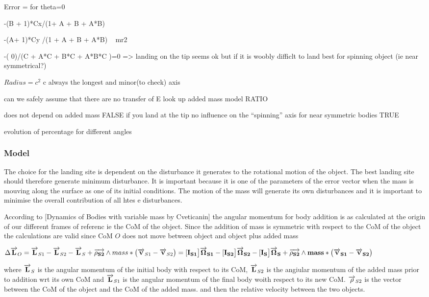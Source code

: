 Error = for theta=0

-(B + 1)*Cx/(1+ A + B + A*B) 

-(A+ 1)*Cy /(1  + A + B + A*B) ~ mr2

-(  0)/(C + A*C + B*C + A*B*C )=0 => landing on the tip seems ok but if it is woobly difficlt to land best for spinning object (ie near symmetrical?)


$Radius=c^2$ c always the longest and minor(to check) axis

can we safely assume that there are no transfer of E look up added mass model RATIO

does not depend on added mass FALSE
if you land at the tip no influence on the “spinning” axis for near symmetric bodies TRUE


evolution of percentage for different angles

\subsubsection{Model}
\label{Model}
The choice for the landing site is dependent on the disturbance it generates to the rotational motion of the object. The best landing site should therefore generate minimum disturbance. It is important because it is one of the parameters of the error vector when the mass is mouving along the surface as one of its initial conditions. The motion of the mass will generate its own disturbances and it is important to  minimise the overall contribution of all htes e disturbances.

According to [Dynamics of Bodies with variable mass by Cveticanin] the angular momentum for body addition is as calculated at the origin of our different frames of referenc ie the CoM of the object. Since the addition of mass is symmetric with respect to the CoM of the object the calculations are valid since CoM $O$ does not move between object and object plus added mass

$\Delta \overrightarrow{\bf L}_{O}= \overrightarrow{\bf L}_{S1}-\overrightarrow{\bf L}_{S2}-\overrightarrow{\bf L}_{S}+\overrightarrow{\bf \rho_{S2}}\wedge mass*\big(\overrightarrow{\bf v}_{S1}-\overrightarrow{\bf v}_{S2} \big)=[\bf I_{S1}\big]\overrightarrow{\bf \Omega}_{S1}-[\bf I_{S2}\big]\overrightarrow{\bf \Omega}_{S2}-[\bf I_{S}\big]\overrightarrow{\bf \Omega}_{S}+\overrightarrow{\bf \rho_{S2}}\wedge mass*\big(\overrightarrow{\bf v}_{S1}-\overrightarrow{\bf v}_{S2} \big)$

where $\overrightarrow{\bf L}_{S}$ is the angular momentum of the initial body with respect to its CoM, $\overrightarrow{\bf L}_{S2}$ is the angiular momentum of the added mass prior to addition wrt its own CoM and  $\overrightarrow{\bf L}_{S1}$ is the angular momentum of the final body woith respect to its new CoM. $\overrightarrow{\bf \rho}_{S2}$ is the vector between the CoM of the object and the CoM of the added mass. and then the relative velocity between the two objects.


